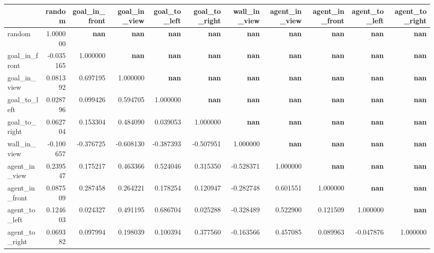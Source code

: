 \begin{tabular}{lrrrrrrrrrr}
\toprule
 & random & goal\_in\_front & goal\_in\_view & goal\_to\_left & goal\_to\_right & wall\_in\_view & agent\_in\_view & agent\_in\_front & agent\_to\_left & agent\_to\_right \\
\midrule
random & 1.000000 & \color{f_white} \bfseries nan & \color{f_white} \bfseries nan & \color{f_white} \bfseries nan & \color{f_white} \bfseries nan & \color{f_white} \bfseries nan & \color{f_white} \bfseries nan & \color{f_white} \bfseries nan & \color{f_white} \bfseries nan & \color{f_white} \bfseries nan \\
goal\_in\_front & -0.035165 & 1.000000 & \color{f_white} \bfseries nan & \color{f_white} \bfseries nan & \color{f_white} \bfseries nan & \color{f_white} \bfseries nan & \color{f_white} \bfseries nan & \color{f_white} \bfseries nan & \color{f_white} \bfseries nan & \color{f_white} \bfseries nan \\
goal\_in\_view & 0.081392 & 0.697195 & 1.000000 & \color{f_white} \bfseries nan & \color{f_white} \bfseries nan & \color{f_white} \bfseries nan & \color{f_white} \bfseries nan & \color{f_white} \bfseries nan & \color{f_white} \bfseries nan & \color{f_white} \bfseries nan \\
goal\_to\_left & 0.028796 & 0.099426 & 0.594705 & 1.000000 & \color{f_white} \bfseries nan & \color{f_white} \bfseries nan & \color{f_white} \bfseries nan & \color{f_white} \bfseries nan & \color{f_white} \bfseries nan & \color{f_white} \bfseries nan \\
goal\_to\_right & 0.062704 & 0.153304 & 0.484090 & 0.039053 & 1.000000 & \color{f_white} \bfseries nan & \color{f_white} \bfseries nan & \color{f_white} \bfseries nan & \color{f_white} \bfseries nan & \color{f_white} \bfseries nan \\
wall\_in\_view & -0.100657 & -0.376725 & -0.608130 & -0.387393 & -0.507951 & 1.000000 & \color{f_white} \bfseries nan & \color{f_white} \bfseries nan & \color{f_white} \bfseries nan & \color{f_white} \bfseries nan \\
agent\_in\_view & 0.239547 & 0.175217 & 0.463366 & 0.524046 & 0.315350 & -0.528371 & 1.000000 & \color{f_white} \bfseries nan & \color{f_white} \bfseries nan & \color{f_white} \bfseries nan \\
agent\_in\_front & 0.087509 & 0.287458 & 0.264221 & 0.178254 & 0.120947 & -0.282748 & 0.601551 & 1.000000 & \color{f_white} \bfseries nan & \color{f_white} \bfseries nan \\
agent\_to\_left & 0.124603 & 0.024327 & 0.491195 & 0.686704 & 0.025288 & -0.328489 & 0.522900 & 0.121509 & 1.000000 & \color{f_white} \bfseries nan \\
agent\_to\_right & 0.069382 & 0.097994 & 0.198039 & 0.100394 & 0.377560 & -0.163566 & 0.457085 & 0.089963 & -0.047876 & 1.000000 \\
\bottomrule
\end{tabular}